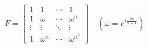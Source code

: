 \documentclass[preview]{standalone}
\begin{document}
\begin{align*}
F = \begin{bmatrix} 1 & 1 & \cdots & 1 \\ 1 & \omega & \cdots & \omega^{n} \\ \vdots & \vdots & \ddots & \vdots \\ 1 & \omega^{n} & \cdots & \omega^{n^2} \end{bmatrix} \quad \left( \omega = e^{i \frac{2\pi}{n+1}} \right)
\end{align*}
\end{document}
